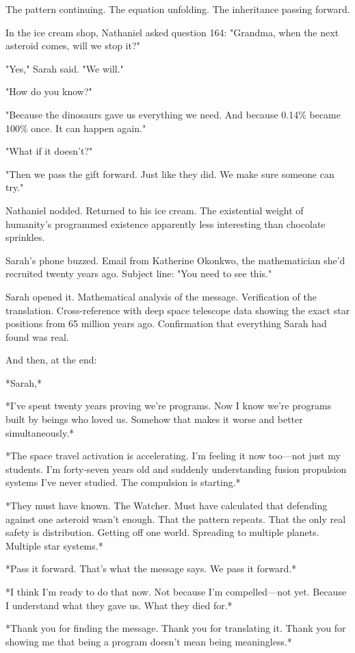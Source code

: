 The pattern continuing. The equation unfolding. The inheritance passing forward.

In the ice cream shop, Nathaniel asked question 164: "Grandma, when the next asteroid comes, will we stop it?"

"Yes," Sarah said. "We will."

"How do you know?"

"Because the dinosaurs gave us everything we need. And because 0.14\% became 100\% once. It can happen again."

"What if it doesn't?"

"Then we pass the gift forward. Just like they did. We make sure someone can try."

Nathaniel nodded. Returned to his ice cream. The existential weight of humanity's programmed existence apparently less interesting than chocolate sprinkles.

Sarah's phone buzzed. Email from Katherine Okonkwo, the mathematician she'd recruited twenty years ago. Subject line: "You need to see this."

Sarah opened it. Mathematical analysis of the message. Verification of the translation. Cross-reference with deep space telescope data showing the exact star positions from 65 million years ago. Confirmation that everything Sarah had found was real.

And then, at the end:

*Sarah,*

*I've spent twenty years proving we're programs. Now I know we're programs built by beings who loved us. Somehow that makes it worse and better simultaneously.*

*The space travel activation is accelerating. I'm feeling it now too—not just my students. I'm forty-seven years old and suddenly understanding fusion propulsion systems I've never studied. The compulsion is starting.*

*They must have known. The Watcher. Must have calculated that defending against one asteroid wasn't enough. That the pattern repeats. That the only real safety is distribution. Getting off one world. Spreading to multiple planets. Multiple star systems.*

*Pass it forward. That's what the message says. We pass it forward.*

*I think I'm ready to do that now. Not because I'm compelled—not yet. Because I understand what they gave us. What they died for.*

*Thank you for finding the message. Thank you for translating it. Thank you for showing me that being a program doesn't mean being meaningless.*

